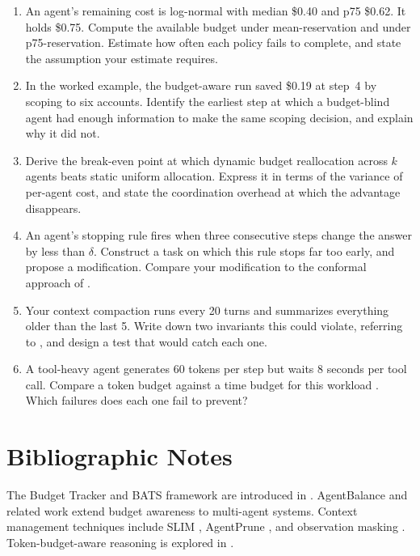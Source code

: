 \begin{enumerate}
\item An agent's remaining cost is log-normal with median \$0.40 and p75 \$0.62.
It holds \$0.75. Compute the available budget under mean-reservation and under
p75-reservation. Estimate how often each policy fails to complete, and state the
assumption your estimate requires.

\item In the worked example, the budget-aware run saved \$0.19 at step~4 by
scoping to six accounts. Identify the earliest step at which a budget-blind agent
had enough information to make the same scoping decision, and explain why it did
not.

\item Derive the break-even point at which dynamic budget reallocation across $k$
agents beats static uniform allocation. Express it in terms of the variance of
per-agent cost, and state the coordination overhead at which the advantage
disappears.

\item An agent's stopping rule fires when three consecutive steps change the
answer by less than $\delta$. Construct a task on which this rule stops far too
early, and propose a modification. Compare your modification to the conformal
approach of \cite{conformalthinking2026}.

\item Your context compaction runs every 20 turns and summarizes everything older
than the last 5. Write down two invariants this could violate, referring to
\cite{govdecay2026}, and design a test that would catch each one.

\item A tool-heavy agent generates 60 tokens per step but waits 8 seconds per tool
call. Compare a token budget against a time budget for this workload
\cite{timelymachine2026}. Which failures does each one fail to prevent?
\end{enumerate}

\section*{Bibliographic Notes}

The Budget Tracker and BATS framework are introduced in \cite{bats2025}. AgentBalance \cite{agentbalance2025} and related work extend budget awareness to multi-agent systems. Context management techniques include SLIM \cite{slim2025}, AgentPrune \cite{agentprune2025}, and observation masking \cite{observationmasking2025}. Token-budget-aware reasoning is explored in \cite{tokenbudget2025}.

